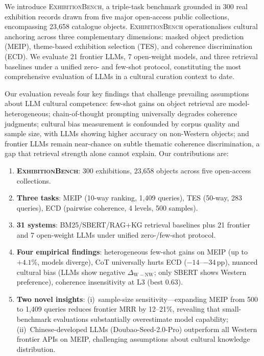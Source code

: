 \documentclass[11pt]{article}
\newcommand{\bench}{\textsc{ExhibitionBench}}
\newcommand{\meip}{\textsc{MEIP}}
\newcommand{\tes}{\textsc{TES}}
\newcommand{\ecd}{\textsc{ECD}}
\begin{document}
We introduce \bench{}, a triple-task benchmark grounded in 300 real
exhibition records drawn from five major open-access public collections,
encompassing 23{,}658 catalogue objects.
\bench{} operationalises cultural anchoring across three complementary
dimensions: masked object prediction (\meip{}), theme-based exhibition
selection (\tes{}), and coherence discrimination (\ecd{}).
We evaluate 21 frontier LLMs, 7 open-weight models, and three retrieval baselines under a unified
zero- and few-shot protocol, constituting the most comprehensive evaluation
of LLMs in a cultural curation context to date.

Our evaluation reveals four key findings that challenge prevailing
assumptions about LLM cultural competence:
few-shot gains on object retrieval are model-heterogeneous;
chain-of-thought prompting universally degrades coherence judgments;
cultural bias measurement is confounded by corpus quality and sample size, with LLMs showing higher accuracy on non-Western objects; and frontier LLMs remain near-chance on subtle thematic coherence
discrimination, a gap that retrieval strength alone cannot explain.
Our contributions are:



\begin{enumerate}[noitemsep]
    \item \textbf{\bench{}}: 300 exhibitions, 23{,}658 objects across five open-access collections.
    \item \textbf{Three tasks}: \meip{} (10-way ranking, 1{,}409 queries), \tes{} (50-way, 283 queries),
          \ecd{} (pairwise coherence, 4 levels, 500 samples).
    \item \textbf{31 systems}: BM25/SBERT/RAG+KG retrieval baselines plus 21 frontier and 7 open-weight LLMs under unified zero-/few-shot protocol.
    \item \textbf{Four empirical findings}: heterogeneous few-shot gains on MEIP (up to $+4.1\%$, models diverge),
          CoT universally hurts ECD ($-14$--$-34$\,pp),
          nuanced cultural bias (LLMs show negative $\Delta_{\mathrm{W{-}NW}}$; only SBERT shows Western preference),
          coherence insensitivity at L3 (best $0.63$).
    \item \textbf{Two novel insights}: (i)~sample-size sensitivity---expanding MEIP from 500 to 1{,}409 queries
          reduces frontier MRR by 12--21\%, revealing that small-benchmark evaluations substantially
          overestimate model capability; (ii)~Chinese-developed LLMs (Doubao-Seed-2.0-Pro) outperform
          all Western frontier APIs on MEIP, challenging assumptions about cultural knowledge distribution.
\end{enumerate}
\end{document}
